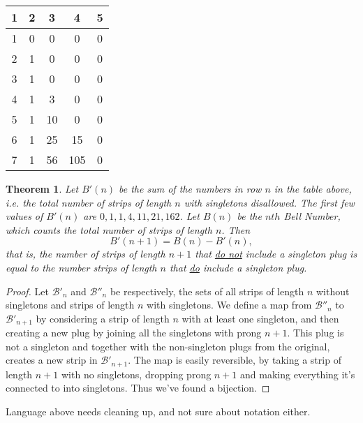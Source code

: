 \documentclass[10pt]{article}
\newtheorem{theorem}{Theorem}
\numberwithin{equation}{section}
\newenvironment{anote}
               {{\textcolor{blue}{Note:}}
                 \itshape
               }
               {}
\begin{document}
\begin{center}
\begin{tabular}{ |c|c|c|c|c| } 
 \hline
 1 & 2 & 3  & 4 & 5\\ 
 \hline
1 & 0 & 0  & 0 & 0\\ 
2 & 1 & 0  & 0 & 0\\ 
3 & 1 & 0  & 0 & 0\\ 
4 & 1 & 3  & 0 & 0\\ 
5 & 1 & 10  & 0 & 0\\ 
6 & 1 & 25  & 15 & 0\\ 
7 & 1 & 56  & 105 & 0\\ 

 \hline
\end{tabular}
\end{center}
\begin{theorem}
Let $B'(n)$ be the sum of the numbers in row $n$ in the table above, i.e. the total number of strips of length $n$ with singletons disallowed. The first few values of $B'(n)$ are $0,1,1,4,11,21,162$. Let $B(n)$ be the $nth$ Bell Number, which counts the total number of strips of length $n$. Then
\begin{equation*}
   B'(n+1)=B(n)-B'(n), 
\end{equation*}
that is, the number of strips of length $n+1$ that \underline{do not} include a singleton plug is equal to the number strips of length $n$ that \underline{do} include a singleton plug. 

\end{theorem}

\begin{proof}
Let $\mathscr{B}'_n$ and $\mathscr{B}''_n$ be respectively, the sets of all strips of length $n$ without singletons and strips of length $n$ with singletons. We define a map from $\mathscr{B}''_n$ to $\mathscr{B}'_{n+1}$ by considering a strip of length $n$ with at least one singleton, and then  creating a new plug by joining all the singletons with prong $n+1$. This plug is not a singleton and together with the non-singleton plugs from the original, creates a new strip in $\mathscr{B}'_{n+1}$. The map is easily reversible, by taking a strip of length $n+1$ with no singletons, dropping prong $n+1$ and making everything it's connected to into singletons. Thus we've found a bijection. 
\end{proof}

\begin{anote}
Language above needs cleaning up, and not sure about notation either. 
\end{anote}
\end{document}
